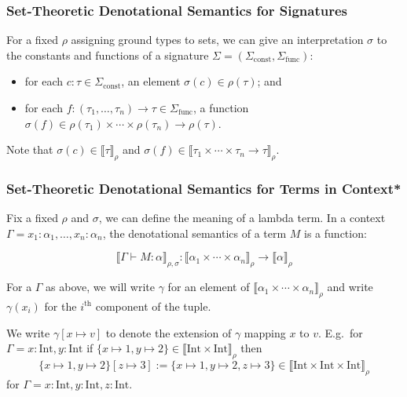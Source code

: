 \documentclass[aspectratio=169]{beamer}
\begin{document}
\begin{frame}
\frametitle{Set-Theoretic Denotational Semantics for Signatures}

\pause

For a fixed $\rho$ assigning ground types to sets, we can give an interpretation $\sigma$  to the constants and functions of a signature $\Sigma = (\Sigma_{\text{const}}, \Sigma_{\text{func}})$:
\begin{itemize}
    \pause
    \item for each $c : \tau \in \Sigma_{\text{const}}$, an element $\sigma(c) \in \rho(\tau)$; and
    \pause
    \item for each $f : (\tau_1, \ldots, \tau_n) \to \tau \in \Sigma_{\text{func}}$, a function $\sigma(f) \in \rho(\tau_1) \times \!\cdots\! \times \rho(\tau_n) \to \rho(\tau)$.
\end{itemize}
\pause
Note that $\sigma(c) \in \llbracket \tau \rrbracket_{\rho}$ and $\sigma(f) \in \llbracket \tau_1 \times \cdots \times \tau_n \rightarrow \tau \rrbracket_{\rho}$.
\end{frame}

\begin{frame}
\frametitle{Set-Theoretic Denotational Semantics for Terms in Context*}

\pause

Fix a fixed $\rho$ and $\sigma$, we can define the meaning of a lambda term.
In a context $\Gamma = x_1 : \alpha_1, \ldots, x_n : \alpha_n$, the denotational semantics of a term $M$ is a function:

\[
\llbracket \Gamma \vdash M : \alpha \rrbracket_{\rho, \sigma} : \llbracket \alpha_1 \times \cdots \times \alpha_n \rrbracket_\rho \to \llbracket \alpha \rrbracket_\rho
\]

For a $\Gamma$ as above, we will write $\gamma$ for an element of $\llbracket \alpha_1 \times \cdots \times \alpha_n \rrbracket_\rho$ and write $\gamma(x_i)$ for the $i^{\text{th}}$ component of the tuple.

\pause
\medskip

We write $\gamma[x \mapsto v]$ to denote the extension of $\gamma$ mapping $x$ to $v$.
E.g.\ for $\Gamma = x : \text{Int}, y : \text{Int}$ if $\{x \mapsto 1, y \mapsto 2\} \in \llbracket \text{Int} \times \text{Int} \rrbracket_\rho$ then
\[
\{x \mapsto 1, y \mapsto 2\}[z \mapsto 3] := \{x \mapsto 1, y \mapsto 2, z \mapsto 3\} \in \llbracket \text{Int} \times \text{Int} \times \text{Int}\rrbracket_\rho
\]
for $\Gamma = x : \text{Int}, y : \text{Int}, z : \text{Int}$.
\end{frame}
\end{document}
